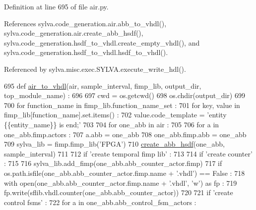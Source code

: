 Definition at line 695 of file air.\+py.



References sylva.\+code\+\_\+generation.\+air.\+abb\+\_\+to\+\_\+vhdl(), sylva.\+code\+\_\+generation.\+air.\+create\+\_\+abb\+\_\+hsdf(), sylva.\+code\+\_\+generation.\+hsdf\+\_\+to\+\_\+vhdl.\+create\+\_\+empty\+\_\+vhdl(), and sylva.\+code\+\_\+generation.\+hsdf\+\_\+to\+\_\+vhdl.\+hsdf\+\_\+to\+\_\+vhdl().



Referenced by sylva.\+misc.\+exec.\+S\+Y\+L\+V\+A.\+execute\+\_\+write\+\_\+hdl().


\begin{DoxyCode}
695 \textcolor{keyword}{def }\hyperlink{namespacesylva_1_1code__generation_1_1air_a12c49366c61395ad719575c8715849cc}{air\_to\_vhdl}(air, sample\_interval, fimp\_lib, output\_dir, top\_module\_name) :
696 
697   cwd = os.getcwd()
698   os.chdir(output\_dir)
699 
700   \textcolor{keywordflow}{for} function\_name \textcolor{keywordflow}{in} fimp\_lib.function\_name\_set :
701     \textcolor{keywordflow}{for} key, value \textcolor{keywordflow}{in} fimp\_lib[function\_name].set.items() :
702       value.code\_template = \textcolor{stringliteral}{'entity \{\{entity\_name\}\} is end;'}
703 
704   \textcolor{keywordflow}{for} one\_abb \textcolor{keywordflow}{in} air :
705 
706     \textcolor{keywordflow}{for} a \textcolor{keywordflow}{in} one\_abb.fimp.actors :
707       a.abb = one\_abb
708     one\_abb.fimp.abb = one\_abb
709     sylva\_lib = fimp.fimp\_lib(\textcolor{stringliteral}{'FPGA'})
710     \hyperlink{namespacesylva_1_1code__generation_1_1air_a5a2588aa1c35ad4bd47d3b8f7eeca94a}{create\_abb\_hsdf}(one\_abb, sample\_interval)
711 
712     \textcolor{keywordflow}{if} \textcolor{stringliteral}{'create temporal fimp lib'} :
713 
714       \textcolor{keywordflow}{if} \textcolor{stringliteral}{'create counter'} :
715 
716         sylva\_lib.add\_fimp(one\_abb.abb\_counter\_actor.fimp)
717         \textcolor{keywordflow}{if} os.path.isfile(one\_abb.abb\_counter\_actor.fimp.name + \textcolor{stringliteral}{'.vhdl'}) == \textcolor{keyword}{False} :
718           with open(one\_abb.abb\_counter\_actor.fimp.name + \textcolor{stringliteral}{'.vhdl'}, \textcolor{stringliteral}{'w'}) \textcolor{keyword}{as} fp :
719             fp.write(sflib.vhdl.counter(one\_abb.abb\_counter\_actor))
720 
721       \textcolor{keywordflow}{if} \textcolor{stringliteral}{'create control fsms'} :
722         \textcolor{keywordflow}{for} a \textcolor{keywordflow}{in} one\_abb.abb\_control\_fsm\_actors :

\end{DoxyCode}
